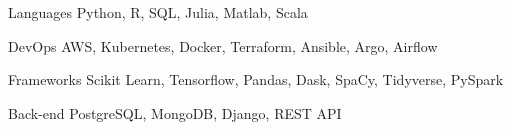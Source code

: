 

\begin{cvskills}

  \cvskill
    {Languages} %
    {Python, R, SQL, Julia, Matlab, Scala} %

  \cvskill
    {DevOps} %
    {AWS, Kubernetes, Docker, Terraform, Ansible, Argo, Airflow} %

  \cvskill
    {Frameworks} %
    {Scikit Learn, Tensorflow, Pandas, Dask, SpaCy, Tidyverse, PySpark} %

  \cvskill
    {Back-end} %
    {PostgreSQL, MongoDB, Django, REST API } %

\end{cvskills}
